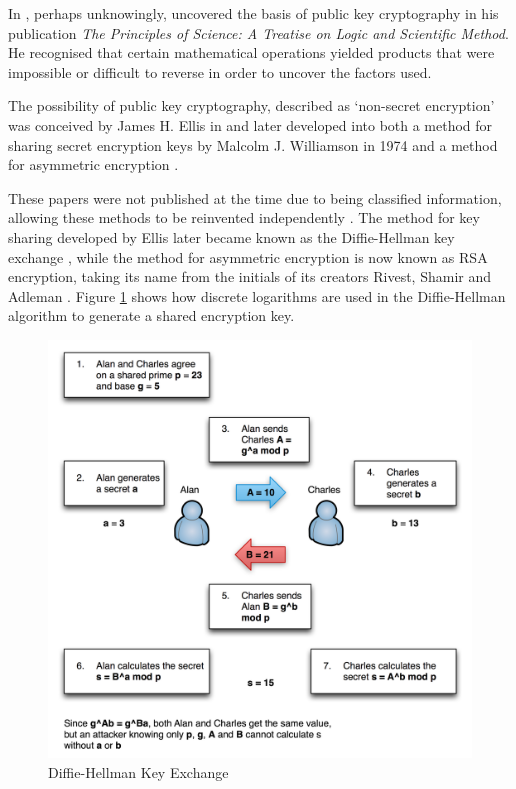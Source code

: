 \documentclass{ecuthesis}
\begin{document}
In \citeyear{Jevons:1874p1167}, \citeauthor{Jevons:1874p1167} perhaps unknowingly, uncovered the basis of public key cryptography in his publication \emph{The Principles of Science: A Treatise on Logic and Scientific Method}. He recognised that certain mathematical operations yielded products that were impossible or difficult to reverse in order to uncover the factors used.

The possibility of public key cryptography, described as ‘non-secret encryption’ was conceived by James H. Ellis in \citeyearpar{Ellis:1970p3249} and later developed into both a method for sharing secret encryption keys by Malcolm J. Williamson in 1974 \citep{Singh:1999p3277} and a method for asymmetric encryption \citep{Cocks:1973p3265}.

These papers were not published at the time due to being classified information, allowing these methods to be reinvented independently \citep{Singh:1999p3277}. The method for key sharing developed by Ellis later became known as the Diffie-Hellman key exchange \cite{Diffie:1976p585}, while the method for asymmetric encryption is now known as RSA encryption, taking its name from the initials of its creators Rivest, Shamir and Adleman \citet*{Rivest:1978p708}. Figure \ref{key-exchange} shows how discrete logarithms are used in the Diffie-Hellman algorithm to generate a shared encryption key.

\begin{figure}[H]
\center \includegraphics[width=\linewidth]{key-exchange}
\caption{Diffie-Hellman Key Exchange}
\label{key-exchange}
\end{figure}
\end{document}
